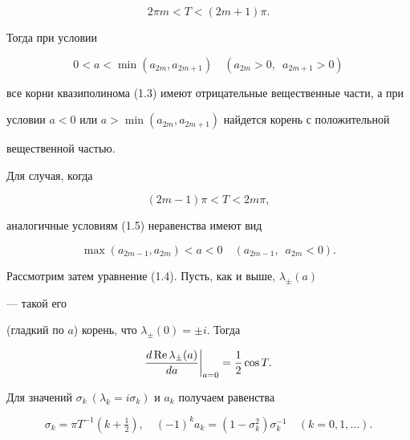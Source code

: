 $$


2\pi m < T < (2m+1)\pi.


$$


Тогда при условии


\begin{equation}


0 < a < \min(a_{2m}, a_{2m+1})\quad (a_{2m} > 0,\ \; a_{2m+1}>0)


\end{equation}


все корни квазиполинома (1.3) имеют отрицательные вещественные части, а при


условии $a<0$ или $a>\min(a_{2m}, a_{2m+1})$ найдется корень с положительной


вещественной частью.


Для случая, когда


\begin{equation}


(2m-1)\pi < T < 2m\pi,


\end{equation}


аналогичные условиям (1.5) неравенства имеют вид


\begin{equation}


\max(a_{2m-1}, a_{2m}) < a < 0 \quad (a_{2m-1},\ \; a_{2m} < 0).


\end{equation}





Рассмотрим затем уравнение (1.4). Пусть, как и выше, $\lambda_\pm(a)$


--- такой его


(гладкий по $a$) корень, что $\lambda_\pm(0) = \pm i$. Тогда


\begin{equation}


\frac{d\re\lambda_\pm(a)}{da}\bigg|_{a=0} = \frac 12 \cos T.


\end{equation}


Для значений $\sigma_k \ (\lambda_k=i\sigma_k)$ и $a_k$ получаем равенства


\begin{equation}


\sigma_k = \pi T^{-1}(k+\tfrac 12),


\quad (-1)^k a_k =(1-\sigma_k^2)\sigma_k^{-1}


\quad (k=0,1,\dotsc).


\end{equation}


